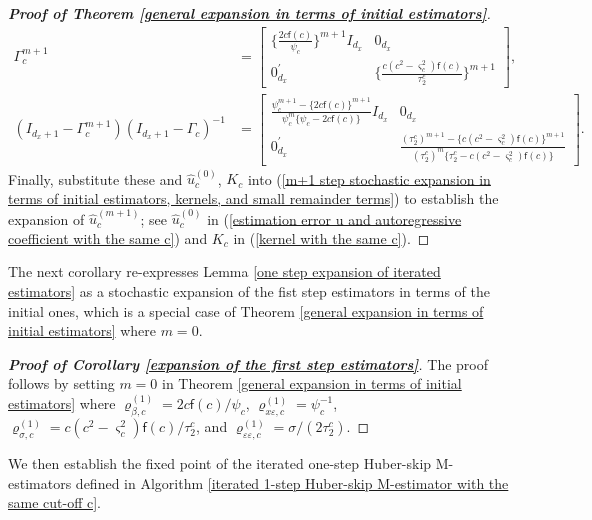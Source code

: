 \documentclass[11pt, letterpaper]{article}
\numberwithin{algorithm}{section}
\numberwithin{assumption}{section}
\numberwithin{lemma}{section}
\numberwithin{theorem}{section}
\numberwithin{corollary}{section}
\numberwithin{remark}{section}
\numberwithin{equation}{section}
\numberwithin{figure}{section}
\numberwithin{table}{section}
\begin{document}
\begin{proof}[\textnormal{\textbf{Proof of Theorem \ref{general expansion in terms of initial estimators}}}]
\begin{align*}
\Gamma_{c}^{m + 1} & =
\begin{bmatrix}
\{ \frac{2 c \mathsf{f}(c)}{\psi_{c}} \}^{m + 1} I_{d_{x}} & 0_{d_{x}} \\
0_{d_{x}}^{\prime} & \{ \frac{c (c^{2} - \varsigma^{2}_{c}) \mathsf{f}(c)}{\tau_{2}^{c}} \}^{m + 1}
\end{bmatrix}
,
\\
(I_{d_{x}+ 1} - \Gamma_{c}^{m + 1}) (I_{d_{x} + 1} - \Gamma_{c})^{-1} & =
\begin{bmatrix}
\frac{\psi_{c}^{m + 1} - \{ 2 c \mathsf{f}(c) \}^{m + 1}}{\psi_{c}^{m} \{ \psi_{c} - 2 c \mathsf{f}(c) \}} I_{d_{x}} & 0_{d_{x}} \\
0_{d_{x}}^{\prime} & \frac{(\tau_{2}^{c})^{m + 1} - \{ c (c^{2} - \varsigma_{c}^{2}) \mathsf{f}(c) \}^{m + 1}}{(\tau_{2}^{c})^{m} \{ \tau_{2}^{c} - c (c^{2} - \varsigma_{c}^{2}) \mathsf{f}(c) \}}
\end{bmatrix}
.
\end{align*}
Finally, substitute these and $\widehat{u}_{c}^{(0)}$, $K_{c}$ into (\ref{m+1 step stochastic expansion in terms of initial estimators, kernels, and small remainder terms}) to establish the expansion of $\widehat{u}_{c}^{(m + 1)}$; see $\widehat{u}_{c}^{(0)}$ in (\ref{estimation error u and autoregressive coefficient with the same c}) and $K_{c}$ in (\ref{kernel with the same c}).
\end{proof}

The next corollary re-expresses Lemma \ref{one step expansion of iterated estimators} as a stochastic expansion of the fist step estimators in terms of the initial ones, which is a special case of Theorem \ref{general expansion in terms of initial estimators} where $m = 0$.

\begin{proof}[\textnormal{\textbf{Proof of Corollary \ref{expansion of the first step estimators}}}]
The proof follows by setting $m = 0$ in Theorem \ref{general expansion in terms of initial estimators} where $\varrho_{\beta, c}^{(1)} = 2 c \mathsf{f}(c) / \psi_{c}$, $\varrho_{x \varepsilon, c}^{(1)}  = \psi_{c}^{-1}$, $\varrho_{\sigma, c}^{(1)} = c (c^{2} - \varsigma_{c}^{2}) \mathsf{f}(c) / \tau_{2}^{c}$, and $\varrho_{\varepsilon \varepsilon, c}^{(1)} = \sigma / (2 \tau_{2}^{c})$.
\end{proof}

We then establish the fixed point of the iterated one-step Huber-skip M-estimators defined in Algorithm \ref{iterated 1-step Huber-skip M-estimator with the same cut-off c}.
\end{document}
